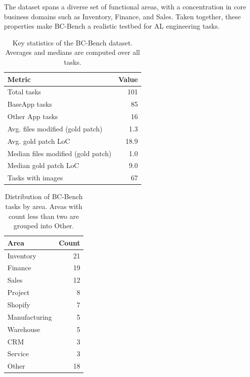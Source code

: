 \documentclass{article}
\begin{document}
The dataset spans a diverse set of functional areas, with a concentration in core business domains such as Inventory, Finance, and Sales. Taken together, these properties make BC-Bench a realistic testbed for AL engineering tasks.

\begin{table}[b]
\vskip 0.05in
\begin{center}
\begin{small}
\begin{sc}
\begin{tabular}{lr}
\toprule
\textbf{Metric} & \textbf{Value} \\
\midrule
Total tasks & 101 \\
BaseApp tasks & 85 \\
Other App tasks & 16 \\
Avg. files modified (gold patch) & 1.3 \\
Avg. gold patch LoC & 18.9 \\
Median files modified (gold patch) & 1.0 \\
Median gold patch LoC & 9.0 \\
Tasks with images & 67 \\
\bottomrule
\end{tabular}
\end{sc}
\end{small}
\end{center}
\caption{Key statistics of the BC-Bench dataset. Averages and medians are computed over all tasks.}
\label{tab:dataset_stats}
\vskip 0.1in
\end{table}

\begin{table}[t]
\vskip 0.05in
\begin{center}
\begin{small}
\begin{sc}
\begin{tabular}{lr}
\toprule
\textbf{Area} & \textbf{Count} \\
\midrule
Inventory & 21 \\
Finance & 19 \\
Sales & 12 \\
Project & 8 \\
Shopify & 7 \\
Manufacturing & 5 \\
Warehouse & 5 \\
CRM & 3 \\
Service & 3 \\
Other & 18 \\
\bottomrule
\end{tabular}
\end{sc}
\end{small}
\end{center}
\caption{Distribution of BC-Bench tasks by area. Areas with count less than two are grouped into Other.}
\label{tab:area_distribution}
\vskip 0.1in
\end{table}
\end{document}
